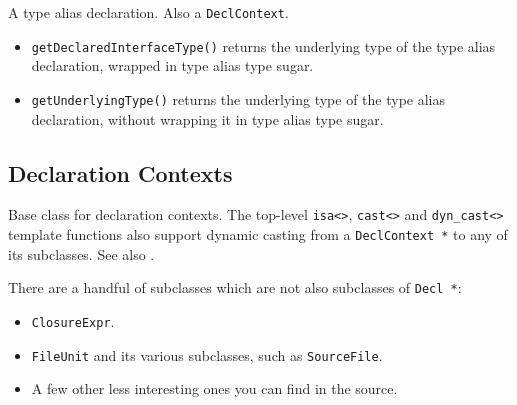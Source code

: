 \documentclass[../generics]{subfiles}
\begin{document}
A type alias declaration. Also a \texttt{DeclContext}.
\begin{itemize}
\item \texttt{getDeclaredInterfaceType()} returns the underlying type of the type alias declaration, wrapped in type alias type sugar.
\item \texttt{getUnderlyingType()} returns the underlying type of the type alias declaration, without wrapping it in type alias type sugar.
\end{itemize}

\subsection*{Declaration Contexts}

Base class for declaration contexts. The top-level \verb|isa<>|, \verb|cast<>| and \verb|dyn_cast<>| template functions also support dynamic casting from a \texttt{DeclContext *} to any of its subclasses. See also .

There are a handful of subclasses which are not also subclasses of \texttt{Decl *}:
\begin{itemize}
\item \texttt{ClosureExpr}.
\item \texttt{FileUnit} and its various subclasses, such as \texttt{SourceFile}.
\item A few other less interesting ones you can find in the source.
\end{itemize}
\end{document}
